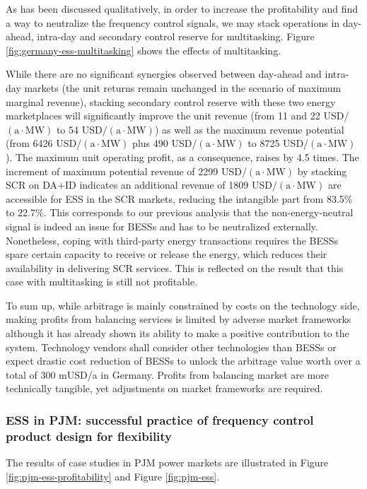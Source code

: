 As has been discussed qualitatively, in order to increase the profitability and find a way to neutralize the frequency control signals, we may stack operations in day-ahead, intra-day and secondary control reserve for multitasking. Figure \ref{fig:germany-ess-multitasking} shows the effects of multitasking.

While there are no significant synergies observed between day-ahead and intra-day markets (the unit returns remain unchanged in the scenario of maximum marginal revenue), stacking secondary control reserve with these two energy marketplaces will significantly improve the unit revenue (from 11 and 22 USD/$(\text{a} \cdot \text{MW})$ to 54 USD/$(\text{a} \cdot \text{MW})$) as well as the maximum revenue potential (from \num{6426} USD/$(\text{a} \cdot \text{MW})$ plus \num{490} USD/$(\text{a} \cdot \text{MW})$ to \num{8725} USD/$(\text{a} \cdot \text{MW})$). The maximum unit operating profit, as a consequence, raises by 4.5 times. The increment of maximum potential revenue of \num{2299} USD/$(\text{a} \cdot \text{MW})$ by stacking SCR on DA+ID indicates an additional revenue of \num{1809} USD/$(\text{a} \cdot \text{MW})$ are accessible for ESS in the SCR markets, reducing the intangible part from 83.5\% to 22.7\%. This corresponds to our previous analysis that the non-energy-neutral signal is indeed an issue for BESSs and has to be neutralized externally. Nonetheless, coping with third-party energy transactions requires the BESSs spare certain capacity to receive or release the energy, which reduces their availability in delivering SCR services. This is reflected on the result that this case with multitasking is still not profitable.

To sum up, while arbitrage is mainly constrained by costs on the technology side, making profits from balancing services is limited by adverse market frameworks although it has already shown its ability to make a positive contribution to the system. Technology vendors shall consider other technologies than BESSs or expect drastic cost reduction of BESSs to unlock the arbitrage value worth over a total of 300 mUSD/a in Germany. Profits from balancing market are more technically tangible, yet adjustments on market frameworks are required.

\subsubsection{ESS in PJM: successful practice of frequency control product design for flexibility}
The results of case studies in PJM power markets are illustrated in Figure \ref{fig:pjm-ess-profitability} and Figure \ref{fig:pjm-ess}.


